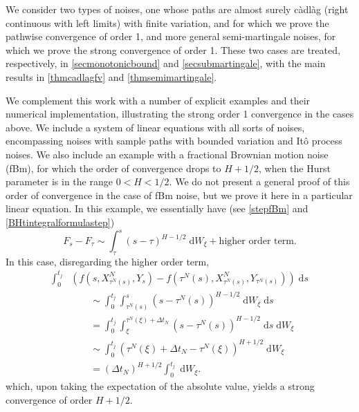 \documentclass[reqno,12pt]{amsart}
\theoremstyle{plain} %
\theoremstyle{definition} %
\begin{document}
We consider two types of noises, one whose paths are almost surely c\`adl\`ag (right continuous with left limits) with finite variation, and for which we prove the pathwise convergence of order 1, and more general semi-martingale noises, for which we prove the strong convergence of order 1.
These two cases are treated, respectively, in \cref{secmonotonicbound} and \cref{secsubmartingale}, with the main results in \cref{thmcadlagfv} and \cref{thmsemimartingale}.

We complement this work with a number of explicit examples and their numerical implementation, illustrating the strong order 1 convergence in the cases above. We include a system of linear equations with all sorts of noises, encompassing noises with sample paths with bounded variation and It\^o process noises. We also include an example with a fractional Brownian motion noise (fBm), for which the order of convergence drops to $H + 1/2$, when the Hurst parameter is in the range $0 < H < 1/2$. We do not present a general proof of this order of convergence in the case of fBm noise, but we prove it here in a particular linear equation. In this example, we essentially have (see \eqref{stepfBm} and \eqref{BHtintegralformulastep})
\[
    F_s - F_\tau \sim \int_\tau^s (s-\tau)^{H-1/2}\;\mathrm{d}W_\xi + \text{higher order term}.
\]
In this case, disregarding the higher order term,
\begin{align*}
    \int_0^{t_j} & \left( f(s, X_{\tau^N(s)}^N, Y_s) - f(\tau^N(s), X_{\tau^N(s)}^N, Y_{\tau^N(s)}) \right)\;\mathrm{d}s \\ 
    & \qquad \sim \int_0^{t_j} \int_{\tau^N(s)}^s (s-\tau^N(s))^{H-1/2} \;\mathrm{d} W_\xi\;\mathrm{d}s \\
    & \qquad = \int_0^{t_j} \int_{\xi}^{\tau^N(\xi) + \Delta t_N} (s-\tau^N(s))^{H-1/2} \;\mathrm{d}s \;\mathrm{d} W_\xi \\
    & \qquad \sim \int_0^{t_j} (\tau^N(\xi) + \Delta t_N - \tau^N(\xi))^{H+1/2} \;\mathrm{d} W_\xi \\
    & \qquad = (\Delta t_N)^{H+1/2} \int_0^{t_j} \;\mathrm{d} W_\xi.
\end{align*}
which, upon taking the expectation of the absolute value, yields a strong convergence of order $H + 1/2$.
\end{document}
